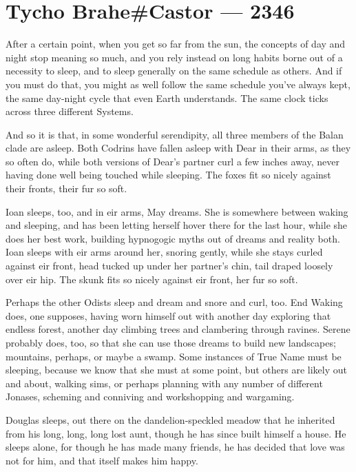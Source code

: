 \hypertarget{tycho-brahecastor-2346}{%
\chapter{Tycho Brahe\#Castor — 2346}\label{tycho-brahecastor-2346}}

After a certain point, when you get so far from the sun, the concepts of day and night stop meaning so much, and you rely instead on long habits borne out of a necessity to sleep, and to sleep generally on the same schedule as others. And if you must do that, you might as well follow the same schedule you've always kept, the same day-night cycle that even Earth understands. The same clock ticks across three different Systems.

And so it is that, in some wonderful serendipity, all three members of the Balan clade are asleep. Both Codrins have fallen asleep with Dear in their arms, as they so often do, while both versions of Dear's partner curl a few inches away, never having done well being touched while sleeping. The foxes fit so nicely against their fronts, their fur so soft.

Ioan sleeps, too, and in eir arms, May dreams. She is somewhere between waking and sleeping, and has been letting herself hover there for the last hour, while she does her best work, building hypnogogic myths out of dreams and reality both. Ioan sleeps with eir arms around her, snoring gently, while she stays curled against eir front, head tucked up under her partner's chin, tail draped loosely over eir hip. The skunk fits so nicely against eir front, her fur so soft.

Perhaps the other Odists sleep and dream and snore and curl, too. End Waking does, one supposes, having worn himself out with another day exploring that endless forest, another day climbing trees and clambering through ravines. Serene probably does, too, so that she can use those dreams to build new landscapes; mountains, perhaps, or maybe a swamp. Some instances of True Name must be sleeping, because we know that she must at some point, but others are likely out and about, walking sims, or perhaps planning with any number of different Jonases, scheming and conniving and workshopping and wargaming.

Douglas sleeps, out there on the dandelion-speckled meadow that he inherited from his long, long, long lost aunt, though he has since built himself a house. He sleeps alone, for though he has made many friends, he has decided that love was not for him, and that itself makes him happy.

